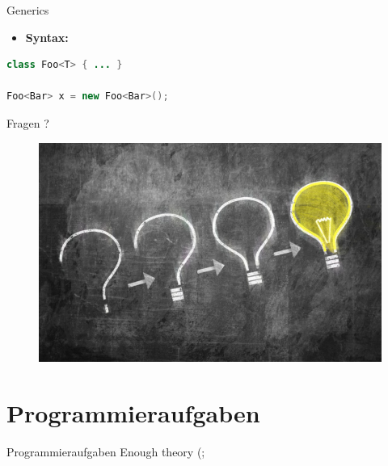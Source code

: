 \documentclass[18pt]{beamer}
\begin{document}
\begin{frame}[fragile]{Generics}
    \begin{itemize}
        \item \textbf{Syntax:}
    \end{itemize}

    \begin{exampleblock}{}
        \begin{lstlisting}[language=Java,basicstyle=\scriptsize]
class Foo<T> { ... }

Foo<Bar> x = new Foo<Bar>();
        \end{lstlisting}

    \end{exampleblock}

\end{frame}


\begin{frame}{Fragen ?}
    \begin{figure}
        \includegraphics[scale=.5]{img/question_to_idea.jpg}
    \end{figure}
\end{frame}

\section{Programmieraufgaben}

\begin{frame}{Programmieraufgaben}
    \Large{Enough theory (;}
\end{frame}
\end{document}
